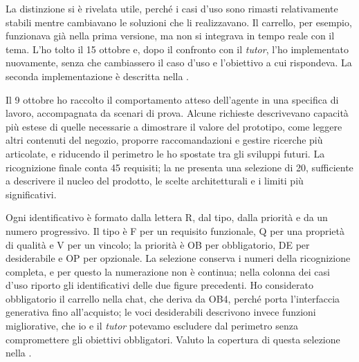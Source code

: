 La distinzione si è rivelata utile, perché i casi d’uso sono rimasti relativamente stabili mentre
cambiavano le soluzioni che li realizzavano. Il carrello, per esempio, funzionava già nella prima
versione, ma non si integrava in tempo reale con il tema. L’ho tolto il 15 ottobre e, dopo il
confronto con il \emph{tutor}, l’ho implementato nuovamente, senza che cambiassero il caso d’uso e
l’obiettivo a cui rispondeva. La seconda implementazione è descritta nella .

Il 9 ottobre ho raccolto il comportamento atteso dell’agente in una specifica di lavoro,
accompagnata da scenari di prova. Alcune richieste descrivevano capacità più estese di quelle
necessarie a dimostrare il valore del prototipo, come leggere altri contenuti del negozio, proporre
raccomandazioni e gestire ricerche più articolate, e riducendo il perimetro le ho spostate tra gli
sviluppi futuri. La ricognizione finale conta 45 requisiti; la 
ne presenta una selezione di 20, sufficiente a descrivere il nucleo del prodotto, le scelte
architetturali e i limiti più significativi.

Ogni identificativo è formato dalla lettera R, dal tipo, dalla priorità e da un numero progressivo.
Il tipo è F per un requisito funzionale, Q per una proprietà di qualità e V per un vincolo; la
priorità è OB per obbligatorio, DE per desiderabile e OP per opzionale. La selezione conserva i
numeri della ricognizione completa, e per questo la numerazione non è continua; nella colonna dei
casi d’uso riporto gli identificativi delle due figure precedenti. Ho considerato
obbligatorio il carrello nella chat, che deriva da OB4, perché porta
l’interfaccia generativa fino all’acquisto; le voci desiderabili descrivono invece funzioni
migliorative, che io e il \emph{tutor} potevamo escludere dal perimetro senza compromettere gli
obiettivi obbligatori. Valuto la copertura di
questa selezione nella .

